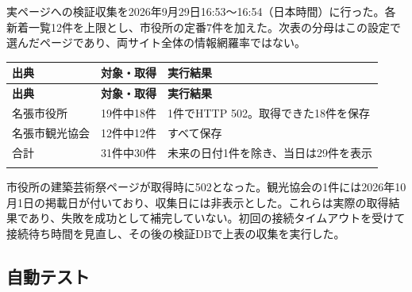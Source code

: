 \documentclass[a4paper,10pt]{ltjsarticle}
\begin{document}
実ページへの検証収集を2026年9月29日16:53〜16:54（日本時間）に行った。各新着一覧12件を上限とし、市役所の定番7件を加えた。次表の分母はこの設定で選んだページであり、両サイト全体の情報網羅率ではない。


{\small\begin{longtable}{@{}>{\raggedright\arraybackslash}p{}>{\raggedright\arraybackslash}p{}>{\raggedright\arraybackslash}p{}@{}}

\rowcolor{Pale}\textbf{出典} & \textbf{対象・取得} & \textbf{実行結果} \\ \midrule

\endfirsthead

\rowcolor{Pale}\textbf{出典} & \textbf{対象・取得} & \textbf{実行結果} \\ \midrule\endhead

名張市役所 & 19件中18件 & 1件でHTTP 502。取得できた18件を保存 \\ \addlinespace[3pt]

名張市観光協会 & 12件中12件 & すべて保存 \\ \addlinespace[3pt]

合計 & 31件中30件 & 未来の日付1件を除き、当日は29件を表示 \\ \addlinespace[3pt]

\bottomrule\end{longtable}}

市役所の建築芸術祭ページが取得時に502となった。観光協会の1件には2026年10月1日の掲載日が付いており、収集日には非表示とした。これらは実際の取得結果であり、失敗を成功として補完していない。初回の接続タイムアウトを受けて接続待ち時間を見直し、その後の検証DBで上表の収集を実行した。


\subsection*{自動テスト}
\end{document}
